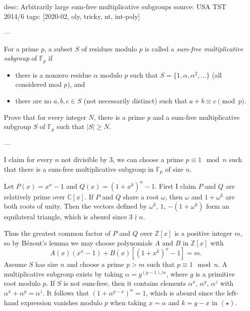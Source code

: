 desc: Arbitrarily large sum-free multiplicative subgroups
source: USA TST 2014/6
tags: [2020-02, oly, tricky, nt, int-poly]

---

For a prime $p$, a subset $S$ of residues modulo $p$ is called a \emph{sum-free multiplicative subgroup} of $\mathbb F_p$ if
\begin{itemize}
    \item there is a nonzero residue $\alpha$ modulo $p$ such that $S=\{1,\alpha,\alpha^2,\ldots\}$ (all considered mod $p$), and
    \item there are no $a,b,c\in S$ (not necessarily distinct) such that $a+b\equiv c\pmod p$.
\end{itemize}
Prove that for every integer $N$, there is a prime $p$ and a sum-free multiplicative subgroup $S$ of $\mathbb F_p$ such that $|S|\ge N$.

---

I claim for every $n$ not divisible by $3$, we can choose a prime $p\equiv1\mod n$ such that there is a sum-free multiplicative subgroup in $\mathbb F_p$ of size $n$.

Let $P(x)=x^n-1$ and $Q(x)=(1+x^k)^n-1$. First I claim $P$ and $Q$ are relatively prime over $\mathbb C[x]$. If $P$ and $Q$ share a root $\omega$, then $\omega$ and $1+\omega^k$ are both roots of unity. Then the vectors defined by $\omega^k$, $1$, $-(1+\omega^k)$ form an equilateral triangle, which is absurd since $3\nmid n$.

Thus the greatest common factor of $P$ and $Q$ over $\mathbb Z[x]$ is a positive integer $m$, so by B\'ezout's lemma we may choose polynomials $A$ and $B$ in $\mathbb Z[x]$ with \[A(x)\left(x^n-1\right)+B(x)\left[\left(1+x^k\right)^n-1\right]=m.\tag{$\star$}\]
Assume $S$ has size $n$ and choose a prime $p>m$ such that $p\equiv1\mod n$. A multiplicative subgroup exists by taking $\alpha=g^{(p-1)/n}$, where $g$ is a primitive root modulo $p$. If $S$ is not sum-free, then it contains elements $\alpha^x$, $\alpha^y$, $\alpha^z$ with $\alpha^x+\alpha^y=\alpha^z$. It follows that $(1+\alpha^{y-x})^n=1$, which is absurd since the left-hand expression vanishes modulo $p$ when taking $x=\alpha$ and $k=y-x$ in $(\star)$.
